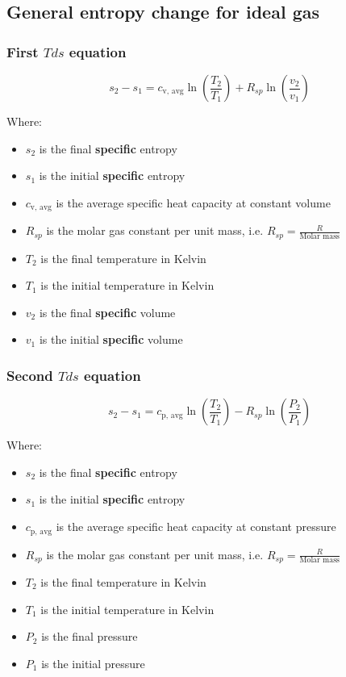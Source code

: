 \documentclass[11pt]{article}
\begin{document}
\subsection{General entropy change for ideal gas}
\label{sec:orgcbb3f38}

\subsubsection{First \(T ds\) equation}
\label{sec:org860f619}
\[s_2 - s_1 = c_{\text{v, avg}} \ln \left( \frac{T_2}{T_1} \right) + R_{sp} \ln \left(\frac{v_2}{v_1} \right)\]

Where:
\begin{itemize}
\item \(s_2\) is the final \textbf{specific} entropy
\item \(s_1\) is the initial \textbf{specific} entropy
\item \(c_{\text{v, avg}}\) is the average specific heat capacity at constant volume
\item \(R_{sp}\) is the molar gas constant per unit mass, i.e. \(R_{sp} = \frac{R}{\text{Molar mass}}\)
\item \(T_2\) is the final temperature in Kelvin
\item \(T_1\) is the initial temperature in Kelvin
\item \(v_2\) is the final \textbf{specific} volume
\item \(v_1\) is the initial \textbf{specific} volume
\end{itemize}

\subsubsection{Second \(T ds\) equation}
\label{sec:org31685a5}
\[s_2 - s_1 = c_{\text{p, avg}} \ln \left( \frac{T_2}{T_1} \right) - R_{sp} \ln \left(\frac{P_2}{P_1} \right)\]

Where:
\begin{itemize}
\item \(s_2\) is the final \textbf{specific} entropy
\item \(s_1\) is the initial \textbf{specific} entropy
\item \(c_{\text{p, avg}}\) is the average specific heat capacity at constant pressure
\item \(R_{sp}\) is the molar gas constant per unit mass, i.e. \(R_{sp} = \frac{R}{\text{Molar mass}}\)
\item \(T_2\) is the final temperature in Kelvin
\item \(T_1\) is the initial temperature in Kelvin
\item \(P_2\) is the final pressure
\item \(P_1\) is the initial pressure
\end{itemize}
\end{document}
